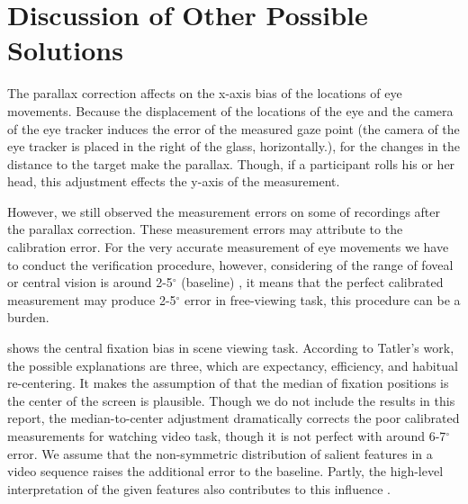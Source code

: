 \documentclass{article}
\begin{document}
\section{Discussion of Other Possible Solutions}

The parallax correction affects on the x-axis bias of the locations of eye movements. Because the displacement of the locations of the eye and the camera of the eye tracker induces the error of the measured gaze point (the camera of the eye tracker is placed in the right of the glass, horizontally.), for the changes in the distance to the target make the parallax. Though, if a participant rolls his or her head, this adjustment effects the y-axis of the measurement.

However, we still observed the measurement errors on some of recordings after the parallax correction. These measurement errors may attribute to the calibration error. For the very accurate measurement of eye movements we have to conduct the verification procedure, however, considering of the range of foveal or central vision is around 2-5$^{\circ}$ (baseline) \citep{mcmorris2014acquisition}, it means that the perfect calibrated measurement may produce 2-5$^{\circ}$ error in free-viewing task, this procedure can be a burden.

\cite{tatler2007central} shows the central fixation bias in scene viewing task. According to Tatler's work, the possible explanations are three, which are expectancy, efficiency, and habitual re-centering. It makes the assumption of that the median of fixation positions is the center of the screen is plausible. Though we do not include the results in this report, the median-to-center adjustment dramatically corrects the poor calibrated measurements for watching video task, though it is not perfect with around 6-7$^{\circ}$ error. We assume that the non-symmetric distribution of salient features in a video sequence raises the additional error to the baseline. Partly, the high-level interpretation of the given features also contributes to this influence \citep{tatler2005visual}.







\end{document}
